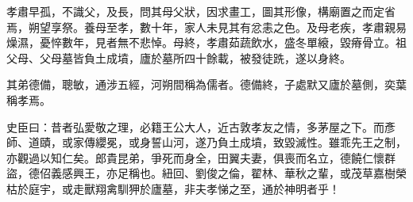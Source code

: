 \begin{pinyinscope}
 孝肅早孤，不識父，及長，問其母父狀，因求畫工，圖其形像，構廟置之而定省焉，朔望享祭。養母至孝，數十年，家人未見其有忿恚之色。及母老疾，孝肅親易燥濕，憂悴數年，見者無不悲悼。母終，孝肅茹蔬飲水，盛冬單縗，毀瘠骨立。祖父母、父母墓皆負土成墳，廬於墓所四十餘載，被發徒跣，遂以身終。



 其弟德備，聰敏，通涉五經，河朔間稱為儒者。德備終，子處默又廬於墓側，奕葉稱孝焉。



 史臣曰：昔者弘愛敬之理，必籍王公大人，近古敦孝友之情，多茅屋之下。而彥師、道賾，或家傳纓冕，或身誓山河，遂乃負土成墳，致毀滅性。雖乖先王之制，亦觀過以知仁矣。郎貴昆弟，爭死而身全，田翼夫妻，俱喪而名立，德饒仁懷群盜，德佋義感興王，亦足稱也。紐回、劉俊之倫，翟林、華秋之輩，或茂草嘉樹榮枯於庭宇，或走獸翔禽馴狎於廬墓，非夫孝悌之至，通於神明者乎！



\end{pinyinscope}